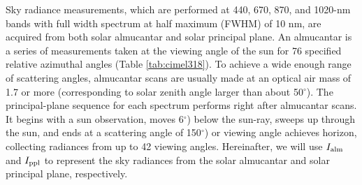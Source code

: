 Sky radiance measurements, which are performed at 440, 670, 870, and 1020-nm
bands with full width spectrum at half maximum (FWHM) of 10 nm, are acquired
from both solar almucantar and solar principal plane. An almucantar is a series 
of measurements taken at the viewing angle of the sun for 76 specified relative 
azimuthal angles (Table \ref{tab:cimel318}). To achieve a wide
enough range of scattering angles, almucantar scans are usually made at an
optical air mass of 1.7 or more (corresponding to solar zenith angle larger
than about 50$^\circ$). The principal-plane sequence for each spectrum performs
right after almucantar scans. It begins with a sun observation, moves 6$^\circ$)
below the sun-ray, sweeps up through the sun, and ends at a scattering angle of
150$^\circ$) or viewing angle achieves horizon, collecting radiances from up to
42 viewing angles. Hereinafter, we will use $I_\text{alm}$ and $I_\text{ppl}$ to represent the sky
radiances from the solar almucantar and solar principal plane, respectively.

